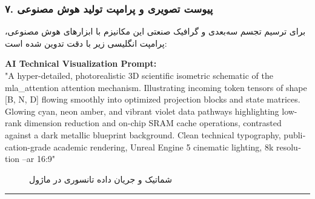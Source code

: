 \subsubsection*{۷. پیوست تصویری و پرامپت تولید هوش مصنوعی}
برای ترسیم تجسم سه‌بعدی و گرافیک صنعتی این مکانیزم با ابزارهای هوش مصنوعی، پرامپت انگلیسی زیر با دقت تدوین شده است:

\vspace{0.2cm}
\begin{latin}
\footnotesize
\textbf{AI Technical Visualization Prompt:}\\
"A hyper-detailed, photorealistic 3D scientific isometric schematic of the mla\_attention attention mechanism. Illustrating incoming token tensors of shape [B, N, D] flowing smoothly into optimized projection blocks and state matrices. Glowing cyan, neon amber, and vibrant violet data pathways highlighting low-rank dimension reduction and on-chip SRAM cache operations, contrasted against a dark metallic blueprint background. Clean technical typography, publication-grade academic rendering, Unreal Engine 5 cinematic lighting, 8k resolution --ar 16:9"
\end{latin}

\begin{figure}[H]
    \centering
    \caption{شماتیک و جریان داده تانسوری در ماژول }
    \label{fig:mla_attention}
\end{figure}

\vspace{0.5cm}
\hrule
\vspace{0.5cm}
